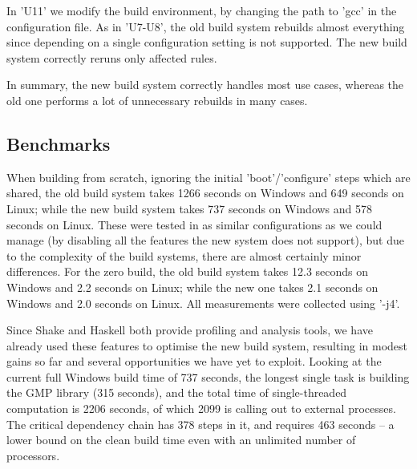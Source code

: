 %
%

In \lst'U11' we modify the build environment, by changing the path to \lst'gcc'
in the configuration file. As in \lst'U7-U8', the old build system rebuilds
almost everything since depending on a single configuration setting is not
supported. The new build system correctly reruns only affected rules.

In summary, the new build system correctly handles most use cases, whereas
the old one performs a lot of unnecessary rebuilds in many cases.

\subsection{Benchmarks\label{sec:benchmarks}}

When building from scratch, ignoring the initial \lst'boot'/\lst'configure'
steps which are shared, the old build system takes 1266 seconds on Windows and
649 seconds on Linux; while the new build system takes 737 seconds on Windows and
578 seconds on Linux. These were tested in as similar configurations as we could
manage (by disabling all the features the new system does not support),
but due to the complexity of the build systems, there are almost certainly
minor differences. For the zero build, the old build system takes 12.3
seconds on Windows and 2.2 seconds on Linux; while the new one takes
2.1 seconds on Windows and 2.0 seconds on Linux. All measurements were collected
using \lst'-j4'.

Since Shake and Haskell both provide profiling and analysis tools, we have
already used these features to optimise the new build system, resulting in
modest gains so far and several opportunities we have yet to exploit. Looking at
the current full Windows build time of 737 seconds, the longest single task is
building the GMP library (315 seconds), and the total time of single-threaded
computation is 2206 seconds, of which 2099 is calling out to external processes.
The critical dependency chain has 378 steps in it, and requires 463 seconds -- a
lower bound on the clean build time even with an unlimited number of processors.
